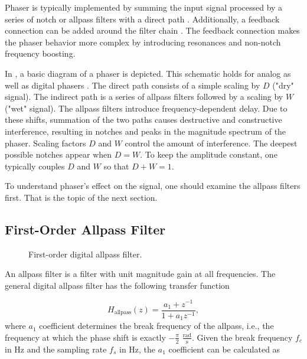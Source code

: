 Phaser is typically implemented by summing the input signal processed by a series of notch or allpass filters with a direct path \cite{Zoelzer2011}. Additionally, a feedback connection can be added around the filter chain \cite{Kiiski2016}. The feedback connection makes the phaser behavior more complex by introducing resonances and non-notch frequency boosting.

In , a basic diagram of a phaser is depicted. This schematic holds for analog as well as digital phasers \cite{PASPWEB2010}. The direct path consists of a simple scaling by $D$ ("dry" signal). The indirect path is a series of allpass filters followed by a scaling by $W$ ("wet" signal). The allpass filters introduce frequency-dependent delay. Due to these shifts, summation of the two paths causes destructive and constructive interference, resulting in notches and peaks in the magnitude spectrum of the phaser. Scaling factors $D$ and $W$ control the amount of interference. The deepest possible notches appear when $D = W$. To keep the amplitude constant, one typically couples $D$ and $W$ so that $D + W = 1$.

To understand phaser's effect on the signal, one should examine the allpass filters first. That is the topic of the next section.


\subsection{First-Order Allpass Filter}
\label{sec:first_order_allpass_filter}
\begin{figure}
    \centering
    
    \caption{First-order digital allpass filter.}
    \label{fig:first_order_allpass_filter}
\end{figure}

An allpass filter is a filter with unit magnitude gain at all frequencies. The general digital allpass filter has the following transfer function \cite{Zoelzer2011,PASPWEB2010,Kiiski2016}

\begin{equation}
    H_\text{allpass}(z) = \frac{a_1 + z^{-1}}{1 + a_1 z^{-1}},
\end{equation}
where $a_1$ coefficient determines the break frequency of the allpass, i.e., the frequency at which the phase shift is exactly $-\frac{\pi}{2}$ $\frac{\text{rad}}{\text{s}}$. Given the break frequency $f_c$ in Hz and the sampling rate $f_s$ in Hz, the $a_1$ coefficient can be calculated as

